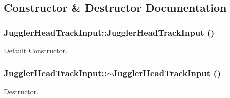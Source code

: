 \subsection{Constructor \& Destructor Documentation}
\hypertarget{class_juggler_head_track_input_a9465d45a5d3f226744992d6919a04c13}{
\subsubsection[{JugglerHeadTrackInput}]{\setlength{\rightskip}{0pt plus 5cm}JugglerHeadTrackInput::JugglerHeadTrackInput ()}}
\label{class_juggler_head_track_input_a9465d45a5d3f226744992d6919a04c13}
Default Constructor. \hypertarget{class_juggler_head_track_input_a6497d13fcfd34b341d009ffa942708af}{
\subsubsection[{$\sim$JugglerHeadTrackInput}]{\setlength{\rightskip}{0pt plus 5cm}JugglerHeadTrackInput::$\sim$JugglerHeadTrackInput ()}}
\label{class_juggler_head_track_input_a6497d13fcfd34b341d009ffa942708af}
Destructor. 

